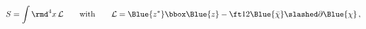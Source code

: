 \begin{equation}
  S=\int \rmd^4 x \,{\cal L} \qquad \mbox{with} \qquad {\cal L}=\Blue{z^*}\bbox \Blue{z}-\ft12\Blue{\bar \chi }\slashed\partial \Blue{\chi
  }\,,
 \label{Schiral}
\end{equation}

